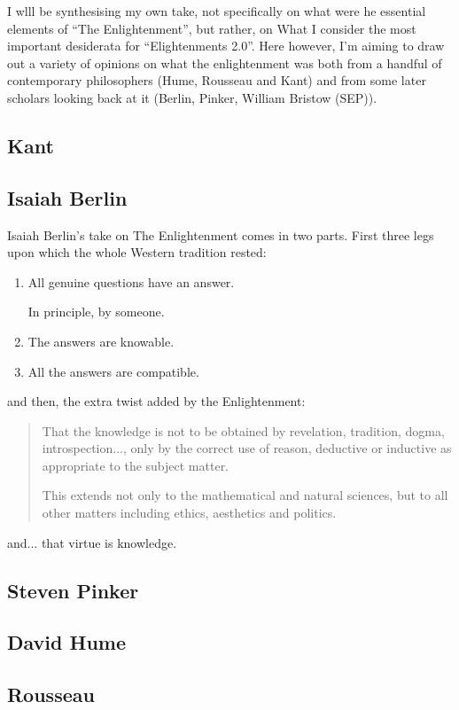 \documentclass[10pt,titlepage]{article}
\begin{document}
I wlll be synthesising my own take, not specifically on what were he essential elements of ``The Enlightenment'', but rather, on What I consider the  most important desiderata for ``Elightenments 2.0''.
Here however, I'm aiming to draw out a variety of opinions on what the enlightenment was both from a handful of contemporary philosophers (Hume, Rousseau and Kant) and from some later scholars looking back at it (Berlin, Pinker, William Bristow (SEP)).

\subsection{Kant}

\subsection{Isaiah Berlin}

Isaiah Berlin's take on The Enlightenment comes in two parts.
First three legs upon which the whole Western tradition rested:
\begin{enumerate}
  \item All genuine questions have an answer.

    In principle, by someone.
\item  The answers are knowable.
\item All the answers are compatible.
\end{enumerate}

and then, the extra twist added by the Enlightenment:
\begin{quotation}
That the knowledge is not to be obtained by revelation, tradition, dogma, introspection..., only by the correct use of reason, deductive or inductive as appropriate to the subject matter.

This extends not only to the mathematical and natural sciences, but to all other matters including ethics, aesthetics and politics.
\end{quotation}
and... that virtue is knowledge.


\subsection{Steven Pinker}

\subsection{David Hume}

\subsection{Rousseau}
\end{document}
